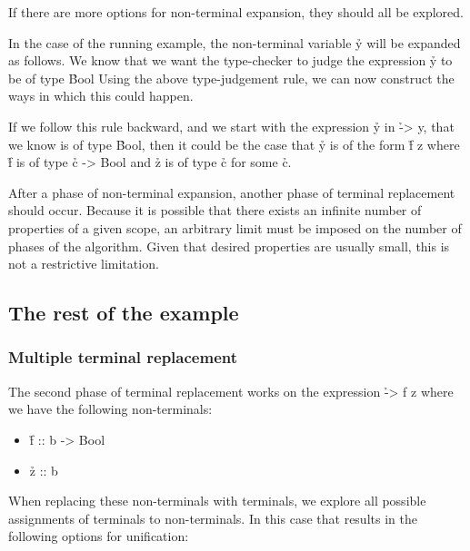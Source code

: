 \documentclass[a4paper, 11pt, onepage]{article}
\begin{document}
If there are more options for non-terminal expansion, they should all be explored.

In the case of the running example, the non-terminal variable \h{y} will be expanded as follows.
We know that we want the type-checker to judge the expression \h{y} to be of type \h{Bool}
Using the above type-judgement rule, we can now construct the ways in which this could happen.

If we follow this rule backward, and we start with the expression \h{y} in \h{\x -> y}, that we know is of type \h{Bool}, then it could be the case that \h{y} is of the form \h{f z} where \h{f} is of type \h{c -> Bool} and \h{z} is of type \h{c} for some \h{c}.

After a phase of non-terminal expansion, another phase of terminal replacement should occur.
Because it is possible that there exists an infinite number of properties of a given scope, an arbitrary limit must be imposed on the number of phases of the algorithm.
Given that desired properties are usually small, this is not a restrictive limitation.


\subsection{The rest of the example}

\subsubsection{Multiple terminal replacement}

The second phase of terminal replacement works on the expression \h{\x -> f z} where we have the following non-terminals:

\begin{itemize}
  \item \h{f :: b -> Bool}
  \item \h{z :: b}
\end{itemize}

When replacing these non-terminals with terminals, we explore all possible assignments of terminals to non-terminals.
In this case that results in the following options for unification:
\end{document}
